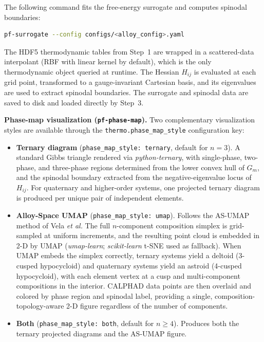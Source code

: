 \documentclass[12pt]{article}
\begin{document}
The following command fits the free-energy surrogate and computes spinodal boundaries:
\begin{lstlisting}[language=bash]
pf-surrogate --config configs/<alloy_config>.yaml
\end{lstlisting}
The HDF5 thermodynamic tables from Step~1 are wrapped in a scattered-data interpolant (RBF with linear kernel by default), which is the only thermodynamic object queried at runtime. The Hessian $H_{ij}$ is evaluated at each grid point, transformed to a gauge-invariant Cartesian basis, and its eigenvalues are used to extract spinodal boundaries. The surrogate and spinodal data are saved to disk and loaded directly by Step~3.

\medskip
\noindent\textbf{Phase-map visualization (\texttt{pf-phase-map}).}
Two complementary visualization styles are available through the \texttt{thermo.phase\_map\_style} configuration key:

\begin{itemize}[leftmargin=1.5em,itemsep=2pt]
  \item \textbf{Ternary diagram} (\texttt{phase\_map\_style: ternary}, default for $n{=}3$).
        A standard Gibbs triangle rendered via \emph{python-ternary}, with
        single-phase, two-phase, and three-phase regions determined from the
        lower convex hull of $G_m$, and the spinodal boundary extracted from
        the negative-eigenvalue locus of $H_{ij}$.  For quaternary and
        higher-order systems, one projected ternary diagram is produced per
        unique pair of independent elements.

  \item \textbf{Alloy-Space UMAP} (\texttt{phase\_map\_style: umap}).
        Follows the AS-UMAP method of Vela \textit{et al.}\cite{vela2025visualizing}
        The full $n$-component composition simplex is grid-sampled at uniform
        increments, and the resulting point cloud is embedded in 2-D by UMAP
        (\emph{umap-learn}; \emph{scikit-learn} t-SNE used as fallback).
        When UMAP embeds the simplex correctly, ternary systems yield a
        deltoid (3-cusped hypocycloid) and quaternary systems yield an astroid
        (4-cusped hypocycloid), with each element vertex at a cusp and
        multi-component compositions in the interior.  CALPHAD data points are
        then overlaid and colored by phase region and spinodal label, providing
        a single, composition-topology-aware 2-D figure regardless of the
        number of components.

  \item \textbf{Both} (\texttt{phase\_map\_style: both}, default for $n{\ge}4$).
        Produces both the ternary projected diagrams and the AS-UMAP figure.
\end{itemize}
\end{document}
